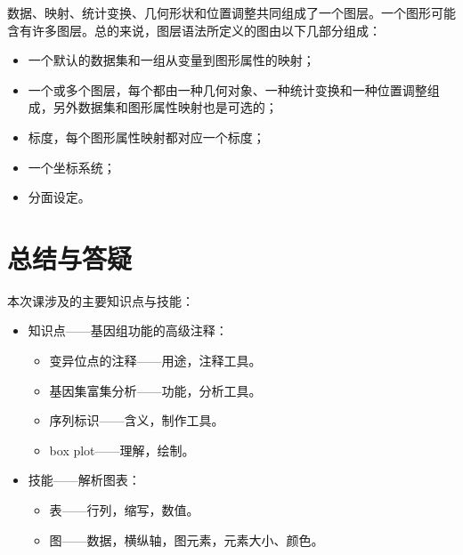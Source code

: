 \documentclass[11pt,a4paper,twoside]{book}
\begin{document}
数据、映射、统计变换、几何形状和位置调整共同组成了一个图层。一个图形可能含有许多图层。总的来说，图层语法所定义的图由以下几部分组成：

\begin{itemize}
  \item 一个默认的数据集和一组从变量到图形属性的映射；
  \item 一个或多个图层，每个都由一种几何对象、一种统计变换和一种位置调整组成，另外数据集和图形属性映射也是可选的；
  \item 标度，每个图形属性映射都对应一个标度；
  \item 一个坐标系统；
  \item 分面设定。
\end{itemize}

\noindent
{}


\section{总结与答疑}
本次课涉及的主要知识点与技能：
\begin{itemize}
  \item 知识点——基因组功能的高级注释：
    \begin{itemize}
      \item 变异位点的注释——用途，注释工具。
      \item 基因集富集分析——功能，分析工具。
      \item 序列标识——含义，制作工具。
      \item box plot——理解，绘制。
    \end{itemize}
  \item 技能——解析图表：
    \begin{itemize}
      \item 表——行列，缩写，数值。
      \item 图——数据，横纵轴，图元素，元素大小、颜色。
    \end{itemize}
\end{itemize}
\end{document}
